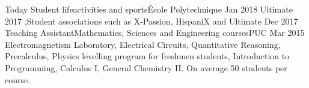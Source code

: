 %
%
%

\begin{experiences}
\experience
    {Today} {Student life}{activities and sports}{École Polytechnique}
    {Jan 2018} { Ultimate 2017 \sep Student associations such as X-Passion, HispaniX and Ultimate}
        {}
  \experience
    {Dec 2017} {Teaching Assistant}{Mathematics, Sciences and Engineering courses}{PUC}
    {Mar 2015} 
    {Electromagnetism Laboratory, Electrical Circuits, Quantitative Reasoning, Precalculus, Physics levelling program for freshmen students, Introduction to Programming, Calculus I, General Chemistry II. On average 50 students per course.}
        {}
\end{experiences}